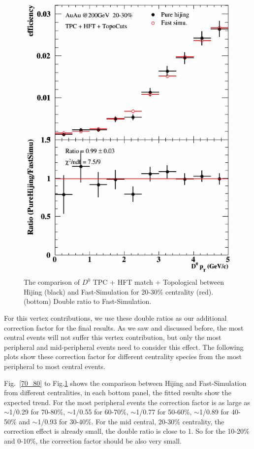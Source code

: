 \documentclass[a4paper]{article}
\begin{document}
\begin{figure}[htbp]
\begin{minipage}[htbp]{0.47\linewidth}
\includegraphics[width=1.0\textwidth,angle=0]{fig/20_30.png} 
\caption{ The comparison of $D^0$ TPC + HFT match + Topological between Hijing (black) and Fast-Simulation for 20-30\% centrality (red). (bottom) Double ratio to Fast-Simulation.\label{20_30}}
\end{minipage}
\end{figure}

For this vertex contributions, we use these double ratios as our additional correction factor for the final results. As we saw and discussed before, the most central events will not suffer this vertex contribution, but only the most peripheral and mid-peripheral events need to consider this effect. The following plots show these correction factor for different centrality species from the most peripheral to most central events.

Fig.~\ref{70_80} to Fig.\ref{20_30} shows the comparison between Hijing and Fast-Simulation from different centralities, in each bottom panel, the fitted results show the expected trend. For the most peripheral events the correction factor is as large as $\sim$1/0.29 for 70-80\%, $\sim$1/0.55 for 60-70\%, $\sim$1/0.77 for 50-60\%, $\sim$1/0.89 for 40-50\% and $\sim$1/0.93 for 30-40\%. For the mid central, 20-30\% centrality, the correction effect is already small, the double ratio is close to 1. So for the 10-20\% and 0-10\%, the correction factor should be also very small.
\end{document}
